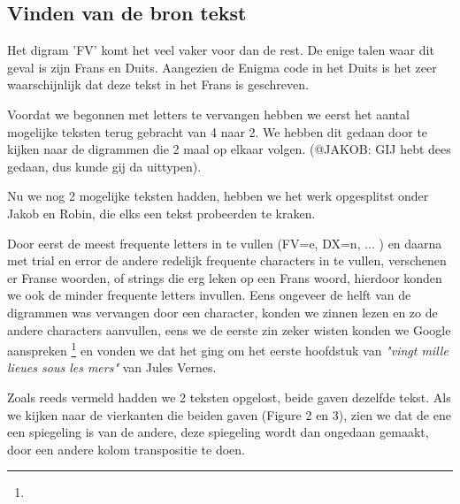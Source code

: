 \documentclass[a4paper,11pt]{article}
\begin{document}
\subsection{Vinden van de bron tekst}

Het digram 'FV' komt het veel vaker voor dan de rest. De enige talen waar dit geval is zijn Frans en Duits. Aangezien de Enigma code in het Duits is het zeer waarschijnlijk dat deze tekst in het Frans is geschreven.

Voordat we begonnen met letters te vervangen hebben we eerst het aantal mogelijke teksten terug gebracht van 4 naar 2. We hebben dit gedaan door te kijken naar de digrammen die 2 maal op elkaar volgen. (@JAKOB: GIJ hebt dees gedaan, dus kunde gij da uittypen).

Nu we nog 2 mogelijke teksten hadden, hebben we het werk opgesplitst onder Jakob en Robin, die elks een tekst probeerden te kraken.

Door eerst de meest frequente letters in te vullen (FV=e, DX=n, ... ) en daarna met trial en error de andere redelijk frequente characters in te vullen, verschenen er Franse woorden, of strings die erg leken op een Frans woord, hierdoor konden we ook de minder frequente letters invullen. Eens ongeveer de helft van de digrammen was vervangen door een character, konden we zinnen lezen en zo de andere characters aanvullen, eens we de eerste zin zeker wisten konden we Google aanspreken \footnote{\googleSearch} en vonden we dat het ging om het eerste hoofdstuk van \textit{"vingt mille lieues sous les mers"} van Jules Vernes. 

Zoals reeds vermeld hadden we 2 teksten opgelost, beide gaven dezelfde tekst. Als we kijken naar de vierkanten die beiden gaven (Figure 2 en 3), zien we dat de ene een spiegeling is van de andere, deze spiegeling wordt dan ongedaan gemaakt, door een andere kolom transpositie te doen.	%
\end{document}
